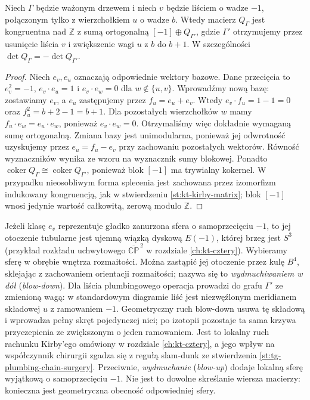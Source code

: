 \begin{stwierdzenie}
Niech $\Gamma$ będzie ważonym drzewem i niech $v$
będzie liściem o wadze $-1$, połączonym tylko z
wierzchołkiem $u$ o wadze $b$. Wtedy macierz
$Q_\Gamma$ jest kongruentna nad $\mathbb Z$
z sumą ortogonalną $[-1]\oplus Q_{\Gamma'}$, gdzie
$\Gamma'$ otrzymujemy przez usunięcie liścia $v$
i zwiększenie wagi $u$ z $b$ do $b+1$.
W szczególności $\det Q_\Gamma=-\det Q_{\Gamma'}$.
\end{stwierdzenie}
\begin{proof}
Niech $e_v,e_u$ oznaczają odpowiednie wektory bazowe.
Dane przecięcia to $e_v^2=-1$, $e_v\cdot e_u=1$
i $e_v\cdot e_w=0$ dla $w\notin\{u,v\}$.
Wprowadźmy nową bazę: zostawiamy $e_v$, a $e_u$
zastępujemy przez $f_u=e_u+e_v$. Wtedy
$e_v\cdot f_u=1-1=0$ oraz
$f_u^2=b+2-1=b+1$. Dla pozostałych wierzchołków
$w$ mamy $f_u\cdot e_w=e_u\cdot e_w$, ponieważ
$e_v\cdot e_w=0$. Otrzymaliśmy więc dokładnie
wymaganą sumę ortogonalną. Zmiana bazy jest
unimodularna, ponieważ jej odwrotność uzyskujemy
przez $e_u=f_u-e_v$ przy zachowaniu pozostałych
wektorów. Równość wyznaczników wynika ze wzoru
na wyznacznik sumy blokowej. Ponadto
$\operatorname{coker}Q_\Gamma\cong
\operatorname{coker}Q_{\Gamma'}$,
ponieważ blok $[-1]$ ma trywialny kokernel.
W przypadku nieosobliwym forma splecenia jest
zachowana przez izomorfizm indukowany
kongruencją, jak w stwierdzeniu
\ref{st:kt-kirby-matrix}; blok $[-1]$ wnosi
jedynie wartość całkowitą, zerową modulo $\mathbb Z$.
\end{proof}

\begin{uwaga}
Jeżeli klasę $e_v$ reprezentuje gładko zanurzona sfera
o samoprzecięciu $-1$, to jej otoczenie tubularne jest
ujemną wiązką dyskową $E(-1)$, której brzeg jest
$S^3$ (przykład rozkładu uchwytowego
$\overline{\mathbb{CP}}^{\,2}$ w rozdziale
\ref{ch:kt-cztery}).
Wybieramy sferę w obrębie wnętrza rozmaitości.
Można zastąpić jej otoczenie przez kulę
$B^4$, sklejając z zachowaniem orientacji
rozmaitości; nazywa się to \emph{wydmuchiwaniem w dół}
(\emph{blow-down}). Dla liścia plumbingowego operacja
prowadzi do grafu $\Gamma'$ ze zmienioną wagą:
w standardowym diagramie liść jest niezwęźlonym
meridianem składowej $u$ z ramowaniem $-1$.
Geometryczny ruch blow-down usuwa tę składową
i wprowadza pełny skręt pojedynczej nici;
po izotopii pozostaje ta sama krzywa
przyczepienia ze zwiększonym o jeden ramowaniem.
Jest to lokalny ruch rachunku Kirby'ego
omówiony w rozdziale \ref{ch:kt-cztery},
a jego wpływ na współczynnik chirurgii
zgadza się z regułą slam-dunk ze
stwierdzenia \ref{st:tg-plumbing-chain-surgery}.
Przeciwnie, \emph{wydmuchanie} (\emph{blow-up}) dodaje
lokalną sferę wyjątkową o samoprzecięciu $-1$.
Nie jest to dowolne skreślanie wiersza macierzy:
konieczna jest geometryczna obecność odpowiedniej sfery.
\end{uwaga}

